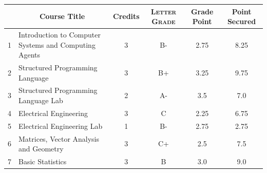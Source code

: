 \documentclass[11pt]{article}
\newcommand*{\numtwo}[1]{\pgfmathprintnumber[
                    fixed, precision=2, fixed zerofill=true]{#1}}
\begin{document}
                \begin{center}
                    \renewcommand{\arraystretch}{1.08}
                    
                \begin{tabular}{|c|l|c|>{\scshape}c|c|c|}
                \hline  \rule[-1ex]{0pt}{3.5ex} {\centering{\bf Course Code}} &  \multicolumn{1}{c|}{\textbf{Course Title}}  & {\bf Credits} & {\bf Letter Grade} & {\bf Grade Point} & {\bf Point Secured}  \\ 
                \hline   1 &  Introduction to Computer Systems and Computing Agents		 & 3 & B- & 2.75 & 8.25 \\ %
                \hline   2 &  Structured Programming Language		 & 3 & B+ & 3.25 & 9.75 \\ %
                \hline   3 &  Structured Programming Language Lab		 & 2 & A- & 3.5 & 7.0 \\ %
                \hline   4 &  Electrical Engineering		 & 3 & C & 2.25 & 6.75 \\ %
                \hline   5 &  Electrical Engineering Lab		 & 1 & B- & 2.75 & 2.75 \\ %
                \hline   6 &  Matrices, Vector Analysis and Geometry		 & 3 & C+ & 2.5 & 7.5 \\ %
                \hline   7 &  Basic Statistics		 & 3 & B & 3.0 & 9.0 \\ %

\hline                %
                \end{tabular}
                \end{center}
                \renewcommand{\arraystretch}{1.03}
\end{document}
